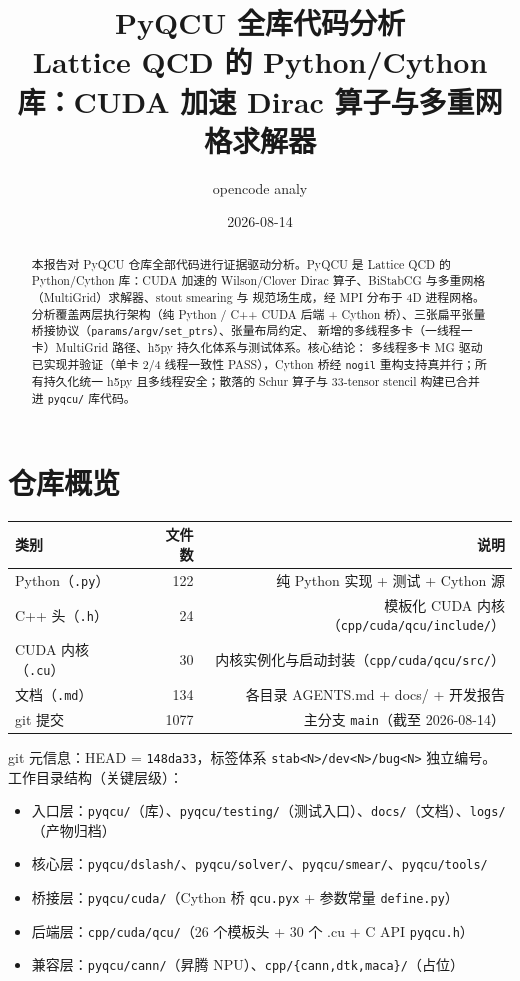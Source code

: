 \documentclass[UTF8]{ctexart}
\title{PyQCU 全库代码分析\\[6pt]\large Lattice QCD 的 Python/Cython 库：CUDA 加速 Dirac 算子与多重网格求解器}
\author{opencode analy}
\date{2026-08-14}
\begin{document}
\maketitle
\begin{abstract}
本报告对 PyQCU 仓库全部代码进行证据驱动分析。PyQCU 是 Lattice QCD 的 Python/Cython 库：CUDA
加速的 Wilson/Clover Dirac 算子、BiStabCG 与多重网格（MultiGrid）求解器、stout smearing 与
规范场生成，经 MPI 分布于 4D 进程网格。分析覆盖两层执行架构（纯 Python / C++ CUDA 后端 +
Cython 桥）、三张扁平张量桥接协议（\texttt{params/argv/set\_ptrs}）、张量布局约定、
新增的多线程多卡（一线程一卡）MultiGrid 路径、h5py 持久化体系与测试体系。核心结论：
多线程多卡 MG 驱动已实现并验证（单卡 2/4 线程一致性 PASS），Cython 桥经 \texttt{nogil}
重构支持真并行；所有持久化统一 h5py 且多线程安全；散落的 Schur 算子与 33-tensor stencil
构建已合并进 \texttt{pyqcu/} 库代码。
\end{abstract}

\tableofcontents

\section{仓库概览}

\begin{center}
\begin{tabular}{lrr}
\toprule
类别 & 文件数 & 说明 \\
\midrule
Python（\texttt{.py}） & 122 & 纯 Python 实现 + 测试 + Cython 源 \\
C++ 头（\texttt{.h}） & 24 & 模板化 CUDA 内核（\texttt{cpp/cuda/qcu/include/}）\\
CUDA 内核（\texttt{.cu}） & 30 & 内核实例化与启动封装（\texttt{cpp/cuda/qcu/src/}）\\
文档（\texttt{.md}） & 134 & 各目录 AGENTS.md + docs/ + 开发报告 \\
git 提交 & 1077 & 主分支 \texttt{main}（截至 2026-08-14）\\
\bottomrule
\end{tabular}
\end{center}

git 元信息：HEAD = \texttt{148da33}，标签体系 \texttt{stab<N>/dev<N>/bug<N>} 独立编号。
工作目录结构（关键层级）：

\begin{itemize}
  \item 入口层：\texttt{pyqcu/}（库）、\texttt{pyqcu/testing/}（测试入口）、\texttt{docs/}（文档）、\texttt{logs/}（产物归档）
  \item 核心层：\texttt{pyqcu/dslash/}、\texttt{pyqcu/solver/}、\texttt{pyqcu/smear/}、\texttt{pyqcu/tools/}
  \item 桥接层：\texttt{pyqcu/cuda/}（Cython 桥 \texttt{qcu.pyx} + 参数常量 \texttt{define.py}）
  \item 后端层：\texttt{cpp/cuda/qcu/}（26 个模板头 + 30 个 .cu + C API \texttt{pyqcu.h}）
  \item 兼容层：\texttt{pyqcu/cann/}（昇腾 NPU）、\texttt{cpp/\{cann,dtk,maca\}/}（占位）
\end{itemize}
\end{document}
